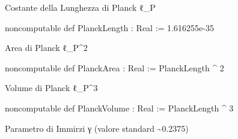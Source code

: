 \documentclass{article}
\newenvironment{Shaded}{%
  \begin{snugshade}%
}{%
  \end{snugshade}%
}%
\newenvironment{Highlighting}{%
}{%
}%
\newcommand{\NormalTok}[1]{#1}
\begin{document}
Costante della Lunghezza di Planck ℓ\_P

\begin{Shaded}
\begin{Highlighting}[]
\NormalTok{noncomputable def PlanckLength : Real := 1.616255e{-}35}

\end{Highlighting}
\end{Shaded}

Area di Planck ℓ\_P\^{}2

\begin{Shaded}
\begin{Highlighting}[]
\NormalTok{noncomputable def PlanckArea : Real := PlanckLength \^{} 2}

\end{Highlighting}
\end{Shaded}

Volume di Planck ℓ\_P\^{}3

\begin{Shaded}
\begin{Highlighting}[]
\NormalTok{noncomputable def PlanckVolume : Real := PlanckLength \^{} 3}

\end{Highlighting}
\end{Shaded}

Parametro di Immirzi γ (valore standard \textasciitilde0.2375)
\end{document}
